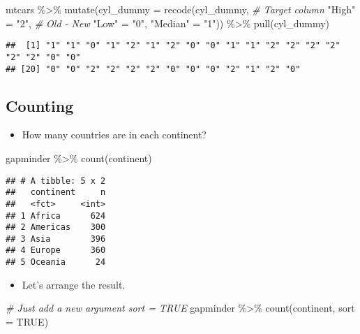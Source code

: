 \documentclass[
]{book}
\newenvironment{Shaded}{\begin{snugshade}}{\end{snugshade}}
\newcommand{\AttributeTok}[1]{\textcolor[rgb]{0.77,0.63,0.00}{#1}}
\newcommand{\CommentTok}[1]{\textcolor[rgb]{0.56,0.35,0.01}{\textit{#1}}}
\newcommand{\ConstantTok}[1]{\textcolor[rgb]{0.00,0.00,0.00}{#1}}
\newcommand{\FunctionTok}[1]{\textcolor[rgb]{0.00,0.00,0.00}{#1}}
\newcommand{\NormalTok}[1]{#1}
\newcommand{\OtherTok}[1]{\textcolor[rgb]{0.56,0.35,0.01}{#1}}
\newcommand{\SpecialCharTok}[1]{\textcolor[rgb]{0.00,0.00,0.00}{#1}}
\newcommand{\StringTok}[1]{\textcolor[rgb]{0.31,0.60,0.02}{#1}}
\providecommand{\tightlist}{%
  \setlength{\itemsep}{0pt}\setlength{\parskip}{0pt}}
\begin{document}
\begin{Shaded}
\begin{Highlighting}[]
\NormalTok{mtcars }\SpecialCharTok{\%\textgreater{}\%}
  \FunctionTok{mutate}\NormalTok{(}\AttributeTok{cyl\_dummy =} \FunctionTok{recode}\NormalTok{(cyl\_dummy, }\CommentTok{\# Target column }
                            \StringTok{"High"} \OtherTok{=} \StringTok{"2"}\NormalTok{, }\CommentTok{\# Old {-} New}
                            \StringTok{"Low"} \OtherTok{=} \StringTok{"0"}\NormalTok{,}
                            \StringTok{"Median"} \OtherTok{=} \StringTok{"1"}\NormalTok{)) }\SpecialCharTok{\%\textgreater{}\%}
  \FunctionTok{pull}\NormalTok{(cyl\_dummy)}
\end{Highlighting}
\end{Shaded}

\begin{verbatim}
##  [1] "1" "1" "0" "1" "2" "1" "2" "0" "0" "1" "1" "2" "2" "2" "2" "2" "2" "0" "0"
## [20] "0" "0" "2" "2" "2" "2" "0" "0" "0" "2" "1" "2" "0"
\end{verbatim}

\hypertarget{counting}{%
\subsection{Counting}\label{counting}}

\begin{itemize}
\tightlist
\item
  How many countries are in each continent?
\end{itemize}

\begin{Shaded}
\begin{Highlighting}[]
\NormalTok{gapminder }\SpecialCharTok{\%\textgreater{}\%}
  \FunctionTok{count}\NormalTok{(continent)}
\end{Highlighting}
\end{Shaded}

\begin{verbatim}
## # A tibble: 5 x 2
##   continent     n
##   <fct>     <int>
## 1 Africa      624
## 2 Americas    300
## 3 Asia        396
## 4 Europe      360
## 5 Oceania      24
\end{verbatim}

\begin{itemize}
\tightlist
\item
  Let's arrange the result.
\end{itemize}

\begin{Shaded}
\begin{Highlighting}[]
\CommentTok{\# Just add a new argument \textasciigrave{}sort = TRUE\textasciigrave{}}
\NormalTok{gapminder }\SpecialCharTok{\%\textgreater{}\%}
  \FunctionTok{count}\NormalTok{(continent, }\AttributeTok{sort =} \ConstantTok{TRUE}\NormalTok{)}
\end{Highlighting}
\end{Shaded}
\end{document}
